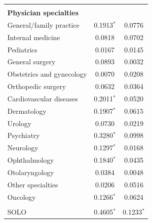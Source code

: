 \documentclass[12pt]{report}
\begin{document}
{\begin{center}
\begin{longtable}{lcc}
                                       &                          &                           \\
\textbf{Physician specialties}         &                          &                           \\
General/family practice                & 0.1913$^{*}$               & 0.0776                    \\
Internal medicine                      & 0.0818                   & 0.0702                    \\
Pediatrics                             & 0.0167                   & 0.0145                    \\
General surgery                        & 0.0893                   & 0.0032                    \\
Obstetrics and gynecology              & 0.0070                   & 0.0208                    \\
Orthopedic surgery                     & 0.0632                   & 0.0364                    \\
Cardiovascular diseases                & 0.2011$^{*}$               & 0.0520                    \\
Dermatology                            & 0.1907$^{*}$               & 0.0615                    \\
Urology                                & 0.0730                   & 0.0219                    \\
Psychiatry                             & 0.3280$^{*}$               & 0.0998                    \\
Neurology                              & 0.1297$^{*}$               & 0.0168                    \\
Ophthalmology                          & 0.1840$^{*}$               & 0.0435                    \\
Otolaryngology                         & 0.0384                   & 0.0048                    \\
Other specialties                      & 0.0206                   & 0.0516                    \\
Oncology                               & 0.1266$^{*}$               & 0.0624                    \\
                                       &                          &                           \\
SOLO                                   & 0.4605$^{*}$               & 0.1233$^{*}$                \\

\end{longtable}
\end{center}}
\end{document}
